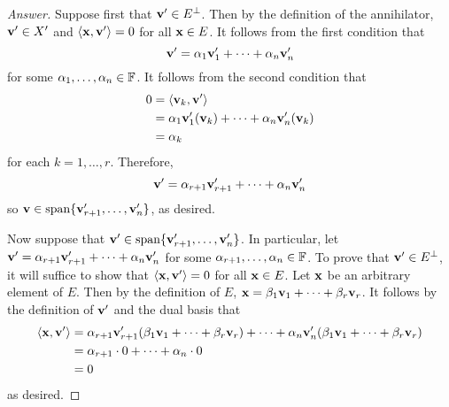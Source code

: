 \documentclass[../psets.tex]{subfiles}
\begin{document}
\begin{enumerate}[label={\textbf{3.\arabic*.}}]
    \begin{proof}[Answer]
        Suppose first that $\mathbf{v}'\in E^\perp$. Then by the definition of the annihilator, $\mathbf{v}'\in X'$ and $\left\langle{\mathbf{x}},{\mathbf{v}'}\right\rangle=0$ for all $\mathbf{x}\in E$. It follows from the first condition that
        \begin{equation*}
            \mathbf{v}' = \alpha_1\mathbf{v}_1'+\cdots+\alpha_n\mathbf{v}_n'
        \end{equation*}
        for some $\alpha_1,\dots,\alpha_n\in\mathbb{F}$. It follows from the second condition that
        \begin{align*}
            0 &= \left\langle{\mathbf{v}_k},{\mathbf{v}'}\right\rangle\\
            &= \alpha_1\mathbf{v}_1'(\mathbf{v}_k)+\cdots+\alpha_n\mathbf{v}_n'(\mathbf{v}_k)\\
            &= \alpha_k
        \end{align*}
        for each $k=1,\dots,r$. Therefore,
        \begin{equation*}
            \mathbf{v}' = \alpha_{r+1}\mathbf{v}_{r+1}'+\cdots+\alpha_n\mathbf{v}_n'
        \end{equation*}
        so $\mathbf{v}\in\operatorname{span}\{\mathbf{v}_{r+1}',\dots,\mathbf{v}_n'\}$, as desired.\par
        Now suppose that $\mathbf{v}'\in\operatorname{span}\{\mathbf{v}_{r+1}',\dots,\mathbf{v}_n'\}$. In particular, let $\mathbf{v}'=\alpha_{r+1}\mathbf{v}_{r+1}'+\cdots+\alpha_n\mathbf{v}_n'$ for some $\alpha_{r+1},\dots,\alpha_n\in\mathbb{F}$. To prove that $\mathbf{v}'\in E^\perp$, it will suffice to show that $\left\langle{\mathbf{x}},{\mathbf{v}'}\right\rangle=0$ for all $\mathbf{x}\in E$. Let $\mathbf{x}$ be an arbitrary element of $E$. Then by the definition of $E$, $\mathbf{x}=\beta_1\mathbf{v}_1+\cdots+\beta_r\mathbf{v}_r$. It follows by the definition of $\mathbf{v}'$ and the dual basis that
        \begin{align*}
            \left\langle{\mathbf{x}},{\mathbf{v}'}\right\rangle &= \alpha_{r+1}\mathbf{v}_{r+1}'(\beta_1\mathbf{v}_1+\cdots+\beta_r\mathbf{v}_r)+\cdots+\alpha_n\mathbf{v}_n'(\beta_1\mathbf{v}_1+\cdots+\beta_r\mathbf{v}_r)\\
            &= \alpha_{r+1}\cdot 0+\cdots+\alpha_n\cdot 0\\
            &= 0
        \end{align*}
        as desired.
    \end{proof}
\end{enumerate}
\end{document}
